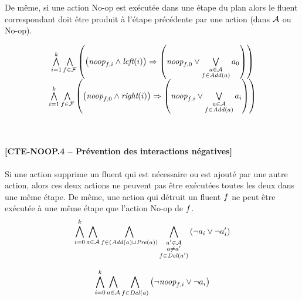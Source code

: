 De même, si une action No-op est exécutée dans une étape du plan alors le fluent correspondant doit être produit à l'étape précédente par une action (dans $\mathcal{A}$ ou No-op).

\begin{small}
\[
\begin{matrix}
\bigwedge\limits_{\substack{i=1}}^{k} \bigwedge\limits_{\substack{f\in \mathcal{F}}} \left(\left(\textit{noop}_{f,i} \wedge \textit{left}(i) \right) \Rightarrow \left(\textit{noop}_{f,0} \vee \bigvee\limits_{\substack{a \in \mathcal{A} \\ f \in \mathit{Add}(a)}} a_{0}\right)\right)\\
\bigwedge\limits_{\substack{i=1}}^{k}\bigwedge\limits_{\substack{f\in \mathcal{F}}}\left(\left(\textit{noop}_{f,0} \wedge \textit{right}(i) \right) \Rightarrow \left(\textit{noop}_{f,i} \vee \bigvee\limits_{\substack{a \in \mathcal{A} \\ f \in \mathit{Add}(a)}} a_{i}\right)\right)
\end{matrix}
\]
\end{small}\\

\paragraph*{[CTE-NOOP.4 -- Prévention des interactions négatives]}

Si une action supprime un fluent qui est nécessaire ou est ajouté par une autre action, alors ces deux actions ne peuvent pas être exécutées toutes les deux dans une même étape. De même, une action qui détruit un fluent $f$ ne peut être exécutée à une même étape que l'action No-op de $f$.
\[ \bigwedge\limits_{\substack{i=0}}^{k} \bigwedge\limits_{\substack{a \in \mathcal{A}}} \bigwedge\limits_{\substack{f\in \left(\mathit{Add}(a) \cup \mathit{Pre}(a)\right)}} \bigwedge\limits_{\substack{a' \in \mathcal{A} \\ a \neq a' \\ f \in \mathit{Del}(a')}}\left(\neg a_{i} \vee \neg a'_{i}\right) \]

\[ \bigwedge\limits_{\substack{i=0}}^{k} \bigwedge\limits_{\substack{a\in \mathcal{A}}} \bigwedge\limits_{\substack{f \in \mathit{Del}(a)}}\left(\neg \textit{noop}_{f,i} \vee \neg a_{i}\right) \]


